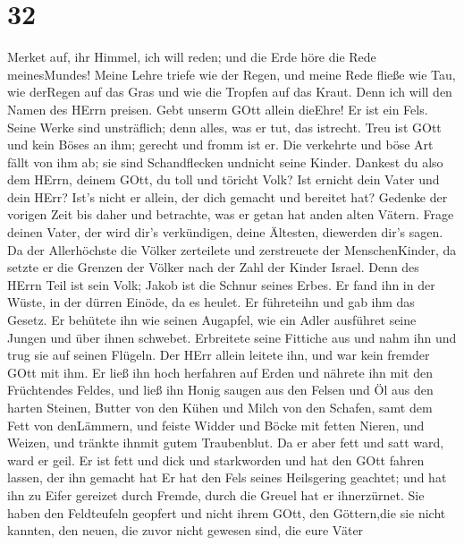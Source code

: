 \hypertarget{section-31}{%
\section{32}\label{section-31}}

 Merket auf, ihr Himmel, ich will reden; und die Erde höre
die Rede meinesMundes!  Meine Lehre triefe wie der Regen,
und meine Rede fließe wie Tau, wie derRegen auf das Gras und wie die
Tropfen auf das Kraut.  Denn ich will den Namen des HErrn
preisen. Gebt unserm GOtt allein dieEhre!  Er ist ein Fels.
Seine Werke sind unsträflich; denn alles, was er tut, das istrecht. Treu
ist GOtt und kein Böses an ihm; gerecht und fromm ist er. 
Die verkehrte und böse Art fällt von ihm ab; sie sind Schandflecken
undnicht seine Kinder.  Dankest du also dem HErrn, deinem
GOtt, du toll und töricht Volk? Ist ernicht dein Vater und dein HErr?
Ist's nicht er allein, der dich gemacht und bereitet hat? 
Gedenke der vorigen Zeit bis daher und betrachte, was er getan hat anden
alten Vätern. Frage deinen Vater, der wird dir's verkündigen, deine
Ältesten, diewerden dir's sagen.  Da der Allerhöchste die
Völker zerteilete und zerstreuete der MenschenKinder, da setzte er die
Grenzen der Völker nach der Zahl der Kinder Israel.  Denn
des HErrn Teil ist sein Volk; Jakob ist die Schnur seines Erbes.
 Er fand ihn in der Wüste, in der dürren Einöde, da es
heulet. Er führeteihn und gab ihm das Gesetz. Er behütete ihn wie seinen
Augapfel,  wie ein Adler ausführet seine Jungen und über
ihnen schwebet. Erbreitete seine Fittiche aus und nahm ihn und trug sie
auf seinen Flügeln.  Der HErr allein leitete ihn, und war
kein fremder GOtt mit ihm.  Er ließ ihn hoch herfahren auf
Erden und nährete ihn mit den Früchtendes Feldes, und ließ ihn Honig
saugen aus den Felsen und Öl aus den harten Steinen, 
Butter von den Kühen und Milch von den Schafen, samt dem Fett von
denLämmern, und feiste Widder und Böcke mit fetten Nieren, und Weizen,
und tränkte ihnmit gutem Traubenblut.  Da er aber fett und
satt ward, ward er geil. Er ist fett und dick und starkworden und hat
den GOtt fahren lassen, der ihn gemacht hat Er hat den Fels seines
Heilsgering geachtet;  und hat ihn zu Eifer gereizet durch
Fremde, durch die Greuel hat er ihnerzürnet.  Sie haben den
Feldteufeln geopfert und nicht ihrem GOtt, den Göttern,die sie nicht
kannten, den neuen, die zuvor nicht gewesen sind, die eure Väter
